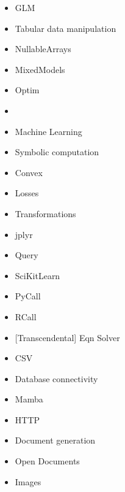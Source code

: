 \begin{itemize}
    \item GLM
    \item {} Tabular data manipulation 
    \item NullableArrays
    \item MixedModels
    \item Optim
    \item {} 
    \item {} Machine Learning
    \item {} Symbolic computation
    \item Convex
    \item Losses
    \item Transformations
    \item jplyr
    \item Query
    \item SciKitLearn
    \item PyCall
    \item RCall
    \item {} [Transcendental] Eqn Solver
    \item CSV
    \item {} Database connectivity
    \item Mamba
    \item HTTP
    \item {} Document generation
    \item {} Open Documents
    \item Images
\end{itemize}